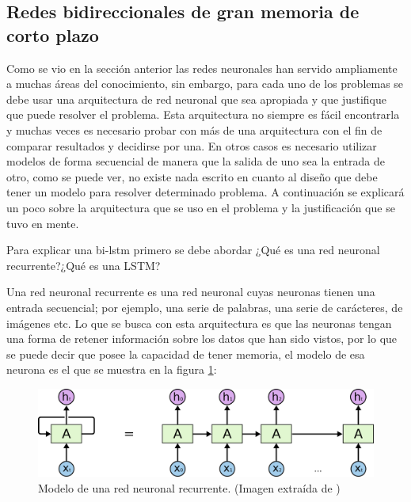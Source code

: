 \subsection{Redes bidireccionales de gran memoria de corto plazo}

\par Como se vio en la sección anterior las redes neuronales han servido ampliamente a muchas áreas del conocimiento, sin embargo, para cada uno de los problemas se debe usar una arquitectura de red neuronal que sea apropiada y que justifique que puede resolver el problema. Esta arquitectura no siempre es fácil encontrarla y muchas veces es necesario probar con más de una arquitectura con el fin de comparar resultados y decidirse por una. En otros casos es necesario utilizar modelos de forma secuencial de manera que la salida de uno sea la entrada de otro, como se puede ver, no existe nada escrito en cuanto al diseño que debe tener un modelo para resolver determinado problema. A continuación se explicará un poco sobre la arquitectura que se uso en el problema y la justificación que se tuvo en mente.

\par Para explicar una \gls{bi-lstm} primero se debe abordar ¿Qué es una red neuronal recurrente?¿Qué es una LSTM?

\par Una red neuronal recurrente es una red neuronal cuyas neuronas tienen una entrada secuencial; por ejemplo, una serie de palabras, una serie de carácteres, de imágenes etc. Lo que se busca con esta arquitectura es que las neuronas tengan una forma de retener información sobre los datos que han sido vistos, por lo que se puede decir que posee la capacidad de tener memoria, el modelo de esa neurona es el que se muestra en la figura \ref{fig:3.10}:

\begin{figure}[H]
	\centering
	\includegraphics[width=\textwidth]{imagenes/RNN-unrolled.png}
	\caption[]{Modelo de una red neuronal recurrente. (Imagen extraída de \textcite{christopher_olah_2015}) }
	\label{fig:3.10}
\end{figure}

